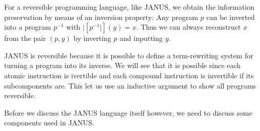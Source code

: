 For a reversible programming language, like JANUS, we obtain the
information preservation by means of an inversion property: Any
program $p$ can be inverted into a program $p^{-1}$ with
$|[p^{-1}|](y) = x$. Thus we can always reconstruct $x$ from the pair
$(p, y)$ by inverting $p$ and inputting $y$.

JANUS is reversible because it is possible to define a term-rewriting
system for turning a program into its inverse. We will see that it is
possible since each atomic instruction is ivertible and each compound
instruction is invertible if its subcomponents are. This let us use an
inductive argument to show all programs reversible.

Before we discuss the JANUS language itself however, we need to
discuss some components used in JANUS.

